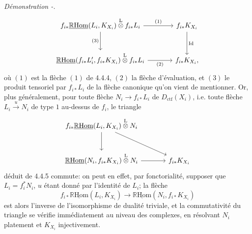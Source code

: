 \documentclass[11pt]{article}
\newenvironment{prooftext}[1][Proof]{\par\noindent\emph{#1.}\ }{\par\medskip}
\newcommand{\R}{\mathbb{R}}\newcommand{\RHomCore}{\mathbb{R}\mathrm{Hom}}
\providecommand{\RHom}{\RHomCore}
\providecommand{\uRHom}{\underline{\RHom}}
\providecommand{\Dctf}{D_{\mathrm{ctf}}}
\providecommand{\Id}{\mathrm{Id}}
\providecommand{\Dctf}{D_{\mathrm{ctf}}}
\providecommand{\RHom}{\RHomCore}
\providecommand{\RHom}{\R\mathcal{H}om}
\providecommand{\R}{\mathrm R}
\providecommand{\RHom}{\RHomCore}
\begin{document}
\begin{prooftext}[Démonstration -]
\begin{equation}
\begin{tikzcd}[column sep=large,row sep=large]
f_{i*}\uRHom(L_i,K_{X_i})\overset{\mathrm{L}}{\otimes} f_{i*}L_i
 \arrow[r,"(1)"] \arrow[d,"(3)"'] &
f_{i*}K_{X_i} \arrow[d,"\Id"]\\
\uRHom(f_{i*}L'_i,f_{i*}K_{X_i})\overset{\mathrm{L}}{\otimes} f_{i*}L_i
 \arrow[r,"(2)"'] &
f_{i*}K_{X_i},
\end{tikzcd}
\end{equation}
où $(1)$ est la flèche $(1)$ de 4.4.4, $(2)$ la flèche d'évaluation, et $(3)$ le produit tensoriel par $f_{i*}L_i$ de la flèche canonique qu'on vient de mentionner. Or, plus généralement, pour toute flèche $N_i\longrightarrow f_{i*}L_i$ de $\Dctf(X_i)$, i.e. toute flèche $L_i\xrightarrow{u}N_i$ de type $1$ au-dessus de $f_i$, le triangle
\[
\begin{tikzcd}[column sep=large,row sep=large]
f_{i*}\uRHom(L_i,K_{X_i})\overset{\mathrm{L}}{\otimes}N_i
 \arrow[dr] \arrow[d] & \\
\uRHom(N_i,f_{i*}K_{X_i})\overset{\mathrm{L}}{\otimes}N_i \arrow[r] &
f_{i*}K_{X_i}
\end{tikzcd}
\]
déduit de 4.4.5 commute: on peut en effet, par fonctorialité, supposer que $L_i=f_i^*N_i$, $u$ étant donné par l'identité de $L_i$; la flèche
\[
f_{i*}\uRHom(L_i,K_{X_i})\longrightarrow\uRHom(N_i,f_{i*}K_{X_i})
\]
est alors l'inverse de l'isomorphisme de dualité triviale, et la commutativité du triangle se vérifie immédiatement au niveau des complexes, en résolvant $N_i$ platement et $K_{X_i}$ injectivement.


\end{prooftext}
\end{document}
